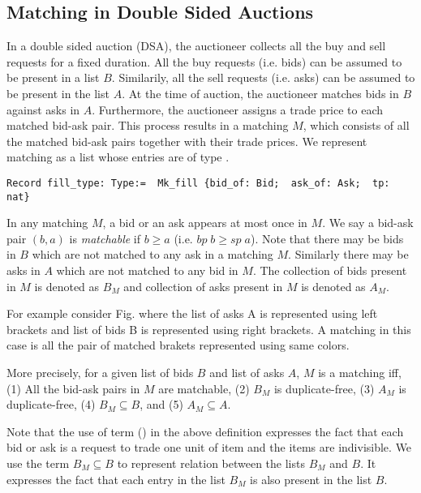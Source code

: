 \documentclass[a4paper,UKenglish,cleveref, autoref]{lipics-v2019}
\begin{document}
\subsection{Matching in Double Sided Auctions}
In a double sided auction (DSA), the auctioneer collects all the buy and sell requests for a fixed duration. All the buy requests (i.e. bids) can be assumed to be present in a list $B$. Similarily, all the sell requests (i.e. asks) can be assumed to be present in the list $A$. At the time of auction, the auctioneer matches bids in $B$ against asks in $A$. Furthermore, the auctioneer assigns a trade price to each matched bid-ask pair. This  process results in  a matching $M$, which consists of all the matched bid-ask pairs together with their trade prices. We represent matching as a list whose entries are of type .
\begin{verbatim}
Record fill_type: Type:=  Mk_fill {bid_of: Bid;  ask_of: Ask;  tp: nat} 
\end{verbatim}

In any matching $M$, a bid or an ask appears at most once in $M$. We say a bid-ask pair $(b, a)$ is \emph{matchable} if $b \ge a$ (i.e. $bp \; b \ge sp \; a$). Note that there may be bids in $B$ which are not matched to any ask in a matching $M$. Similarly there may be asks in $A$ which are not matched to any bid in $M$. The collection of bids present in $M$ is denoted as $B_{M}$ and collection of asks present in $M$ is denoted as $A_M$. 

For example consider  Fig. where the list of asks A is represented using left brackets and list of bids B is represented using right brackets. A matching in this case is all the pair of  matched brakets represented using same colors.   

More precisely, for a given list of bids $B$ and list of asks $A$, $M$ is a matching iff, (1) All the bid-ask pairs in $M$ are matchable, (2) $B_M$ is duplicate-free, (3) $A_M$ is duplicate-free, (4) $B_M \subseteq B$, and (5) $A_M \subseteq A$.

\begin{definition}
\end{definition}
\begin{definition}
\end{definition}
Note that the use of term (\emph{}) in the above definition expresses the fact that each bid or ask is a request to trade one unit of item and the items are indivisible. We use the term $B_M \subseteq B$  to represent  relation between the lists $B_M$ and $B$. It expresses the fact that each entry in the list $B_M$ is also present in the list $B$.
\end{document}

